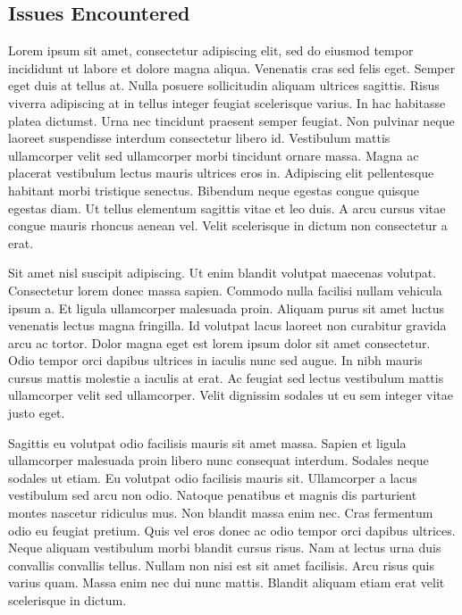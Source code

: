 \documentclass[12pt]{article}
\begin{document}
\subsection{Issues Encountered}
Lorem ipsum  sit amet, consectetur adipiscing elit, sed do eiusmod tempor incididunt ut labore et dolore magna aliqua. Venenatis cras sed felis eget. Semper eget duis at tellus at. Nulla posuere sollicitudin aliquam ultrices sagittis. Risus viverra adipiscing at in tellus integer feugiat scelerisque varius. In hac habitasse platea dictumst. Urna nec tincidunt praesent semper feugiat. Non pulvinar neque laoreet suspendisse interdum consectetur libero id. Vestibulum mattis ullamcorper velit sed ullamcorper morbi tincidunt ornare massa. Magna ac placerat vestibulum lectus mauris ultrices eros in. Adipiscing elit pellentesque habitant morbi tristique senectus. Bibendum neque egestas congue quisque egestas diam. Ut tellus elementum sagittis vitae et leo duis. A arcu cursus vitae congue mauris rhoncus aenean vel. Velit scelerisque in dictum non consectetur a erat.\par
Sit amet nisl suscipit adipiscing. Ut enim blandit volutpat maecenas volutpat. Consectetur lorem donec massa sapien. Commodo nulla facilisi nullam vehicula ipsum a. Et ligula ullamcorper malesuada proin. Aliquam purus sit amet luctus venenatis lectus magna fringilla. Id volutpat lacus laoreet non curabitur gravida arcu ac tortor. Dolor magna eget est lorem ipsum dolor sit amet consectetur. Odio tempor orci dapibus ultrices in iaculis nunc sed augue. In nibh mauris cursus mattis molestie a iaculis at erat. Ac feugiat sed lectus vestibulum mattis ullamcorper velit sed ullamcorper. Velit dignissim sodales ut eu sem integer vitae justo eget.\par
Sagittis eu volutpat odio facilisis mauris sit amet massa. Sapien et ligula ullamcorper malesuada proin libero nunc consequat interdum. Sodales neque sodales ut etiam. Eu volutpat odio facilisis mauris sit. Ullamcorper a lacus vestibulum sed arcu non odio. Natoque penatibus et magnis dis parturient montes nascetur ridiculus mus. Non blandit massa enim nec. Cras fermentum odio eu feugiat pretium. Quis vel eros donec ac odio tempor orci dapibus ultrices. Neque aliquam vestibulum morbi blandit cursus risus. Nam at lectus urna duis convallis convallis tellus. Nullam non nisi est sit amet facilisis. Arcu risus quis varius quam. Massa enim nec dui nunc mattis. Blandit aliquam etiam erat velit scelerisque in dictum.\par
\end{document}
